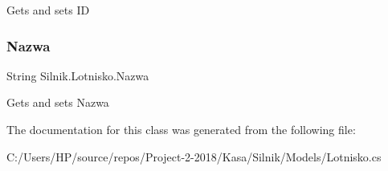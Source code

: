 Gets and sets ID 

\mbox{\label{class_silnik_1_1_lotnisko_a9f92f264a5a3b2e5a8393fff6314d4ea}} 
\subsubsection{\texorpdfstring{Nazwa}{Nazwa}}
{\footnotesize\ttfamily String Silnik.\+Lotnisko.\+Nazwa\hspace{0.3cm}{\ttfamily [get]}}



Gets and sets Nazwa 



The documentation for this class was generated from the following file\+:\begin{DoxyCompactItemize}
\item 
C\+:/\+Users/\+H\+P/source/repos/\+Project-\/2-\/2018/\+Kasa/\+Silnik/\+Models/Lotnisko.\+cs\end{DoxyCompactItemize}
